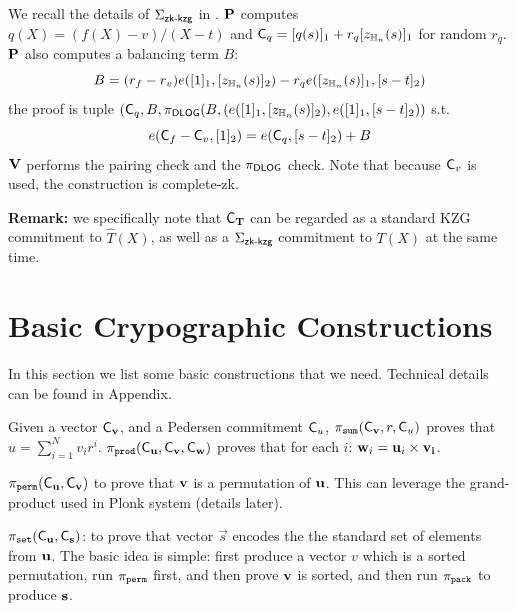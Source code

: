 We recall the details of ${\Sigma_{{\textsf{zk-kzg}}}}$ in .
$\mathbf{P}$ computes $q(X) = (f(X) - v)/(X-t)$ and
${\mathsf{C}}_q = [q(s)]_1 + r_q[z_{\mathbb{H}_{n}}(s)]_1$ for random
$r_q$. $\mathbf{P}$ also computes a balancing term $B$:
\[
	B = (r_f - r_v) e([1]_1, [z_{\mathbb{H}_{n}}(s)]_2)
		 - r_q e([z_{\mathbb{H}_{n}}(s)]_1, [s-t]_2)
\]
the proof is tuple $({\mathsf{C}}_q, B, {\pi_{{\textsf{DLOG}}}}(B, (e([1]_1, [z_{\mathbb{H}_{n}}(s)]_2), e([1]_1, [s-t]_2))$ s.t.
\[
	e({\mathsf{C}}_f - {\mathsf{C}}_v, [1]_2) = 
	e({\mathsf{C}}_q, [s-t]_2) + B
\]
$\mathbf{V}$ performs the pairing check and the ${\pi_{{\textsf{DLOG}}}}$ check.
Note that because ${\mathsf{C}}_v$ is used, the construction
is complete-zk.

{\bf Remark:}  we specifically note that
${\mathsf{C}}_{{{\mathbf {T}}}}$ can be regarded as a standard
KZG commitment to $\hat{T}(X)$,  as well as a
${\Sigma_{{\textsf{zk-kzg}}}}$ commitment to $T(X)$ at the same time.

\section{Basic Crypographic Constructions}
In this section we list some basic constructions that we need.
Technical details can be found in Appendix.

Given a vector ${\mathsf{C}}_{{{\mathbf {v}}}}$, and a Pedersen
commitment ${\mathsf{C}}_u$, $\pi_{\texttt{sum}}({\mathsf{C}}_{{{\mathbf {v}}}}, r, {\mathsf{C}}_u)$
proves that $u = \sum_{i=1}^N v_i r^i$.
$\pi_{\texttt{prod}}({\mathsf{C}}_{{\mathbf {u}}}, {\mathsf{C}}_{{\mathbf {v}}}, {\mathsf{C}}_{{\mathbf {w}}})$
proves that for each $i$: ${{\mathbf {w}}}_i = {{\mathbf {u}}}_i \times {{\mathbf {v_i}}}$.

$\pi_{\texttt{perm}}({\mathsf{C}}_{{{\mathbf {u}}}}, {\mathsf{C}}_{{{\mathbf {v}}}})$ to prove that
${{\mathbf {v}}}$ is a permutation of ${{\mathbf {u}}}$. This can leverage
the grand-product used in Plonk system (details later).

$\pi_{\texttt{set}}({\mathsf{C}}_{{\mathbf {u}}}, {\mathsf{C}}_{{\mathbf {s}}})$: to prove that
vector $\vec{s}$ encodes the the standard set of elements from
${{\mathbf {u}}}$. The basic idea is simple: first produce
a vector $v$ which is a sorted permutation, run $\pi_{\texttt{perm}}$ 
first, and then prove ${{\mathbf {v}}}$ is sorted, and 
then run $\pi_{\texttt{pack}}$ to produce ${{\mathbf {s}}}$.



